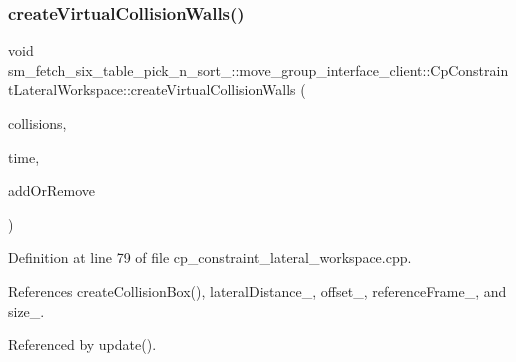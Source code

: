 \subsubsection{\texorpdfstring{create\+Virtual\+Collision\+Walls()}{createVirtualCollisionWalls()}}
{\footnotesize\ttfamily void sm\+\_\+fetch\+\_\+six\+\_\+table\+\_\+pick\+\_\+n\+\_\+sort\+\_\+::move\+\_\+group\+\_\+interface\+\_\+client\+::\+Cp\+Constraint\+Lateral\+Workspace\+::create\+Virtual\+Collision\+Walls (\begin{DoxyParamCaption}\item[{std\+::vector$<$ moveit\+\_\+msgs\+::\+Collision\+Object $>$ \&}]{collisions,  }\item[{const ros\+::\+Time \&}]{time,  }\item[{int}]{add\+Or\+Remove }\end{DoxyParamCaption})}



Definition at line 79 of file cp\+\_\+constraint\+\_\+lateral\+\_\+workspace.\+cpp.



References create\+Collision\+Box(), lateral\+Distance\+\_\+, offset\+\_\+, reference\+Frame\+\_\+, and size\+\_\+.



Referenced by update().



